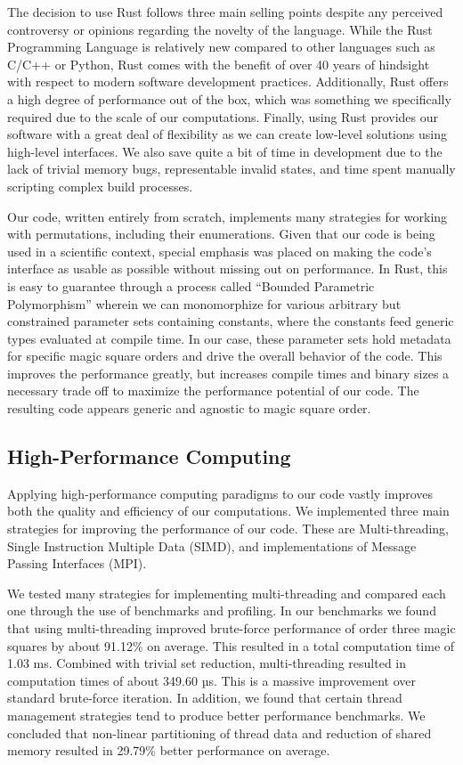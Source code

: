 \documentclass{rhumj_new}
\begin{document}
The decision to use Rust follows three main selling points despite any perceived controversy
or opinions regarding the novelty of the language. While the Rust Programming Language is
relatively new compared to other languages such as C/C++ or Python, Rust comes with the benefit of
over 40 years of hindsight with respect to modern software development practices. Additionally,
Rust offers a high degree of performance out of the box, which was something we specifically
required due to the scale of our computations. Finally, using Rust provides our software with a
great deal of flexibility as we can create low-level solutions using high-level interfaces. We also
save quite a bit of time in development due to the lack of trivial memory bugs, representable
invalid states, and time spent manually scripting complex build processes.

Our code, written entirely from scratch, implements many strategies for working with
permutations, including their enumerations. Given that our code is being used in a scientific
context, special emphasis was placed on making the code's interface as usable as possible without
missing out on performance. In Rust, this is easy to guarantee through a process called ``Bounded
Parametric Polymorphism'' wherein we can monomorphize for various arbitrary but constrained
parameter sets containing constants, where the constants feed generic types evaluated at compile
time\cite{Cardelli}. In our case, these parameter sets hold metadata for specific magic square
orders and
drive the overall behavior of the code. This improves the performance greatly, but increases
compile times and binary sizes \textemdash{} a necessary trade off to maximize the performance
potential
of our code. The resulting code appears generic and agnostic to magic square order.

\subsection{High-Performance Computing}

Applying high-performance computing paradigms to our code vastly improves both the quality and
efficiency of our computations. We implemented three main strategies for improving the performance
of our code. These are Multi-threading, Single Instruction Multiple Data (SIMD), and
implementations of Message Passing Interfaces (MPI).

We tested many strategies for implementing multi-threading and compared each one through the
use of benchmarks and profiling. In our benchmarks we found that using multi-threading improved
brute-force performance of order three magic squares by about 91.12\% on average. This resulted in
a total computation time of 1.03 ms. Combined with trivial set reduction, multi-threading resulted
in computation times of about 349.60 µs. This is a massive improvement over standard brute-force
iteration. In addition, we found that certain thread management strategies tend to produce better
performance benchmarks. We concluded that non-linear partitioning of thread data and reduction of
shared memory resulted in 29.79\% better performance on average.
\end{document}
